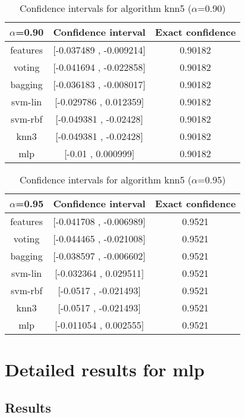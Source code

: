 \documentclass[a4paper,10pt]{article}
\begin{document}
\begin{table}[!htp]
\centering\small
\begin{tabular}{
|c|c|c|}
\hline
 $\alpha$=0.90 & Confidence interval & Exact confidence \\ \hline 
features & [-0.037489 , -0.009214] & 0.90182\\ \hline 
voting & [-0.041694 , -0.022858] & 0.90182\\ \hline 
bagging & [-0.036183 , -0.008017] & 0.90182\\ \hline 
svm-lin & [-0.029786 , 0.012359] & 0.90182\\ \hline 
svm-rbf & [-0.049381 , -0.02428] & 0.90182\\ \hline 
knn3 & [-0.049381 , -0.02428] & 0.90182\\ \hline 
mlp & [-0.01 , 0.000999] & 0.90182\\ \hline 

\end{tabular}
\caption{Confidence intervals for algorithm knn5 ($\alpha$=0.90)}
\end{table}
\begin{table}[!htp]
\centering\small
\begin{tabular}{
|c|c|c|}
\hline
 $\alpha$=0.95 & Confidence interval & Exact confidence \\ \hline 
features & [-0.041708 , -0.006989] & 0.9521\\ \hline 
voting & [-0.044465 , -0.021008] & 0.9521\\ \hline 
bagging & [-0.038597 , -0.006602] & 0.9521\\ \hline 
svm-lin & [-0.032364 , 0.029511] & 0.9521\\ \hline 
svm-rbf & [-0.0517 , -0.021493] & 0.9521\\ \hline 
knn3 & [-0.0517 , -0.021493] & 0.9521\\ \hline 
mlp & [-0.011054 , 0.002555] & 0.9521\\ \hline 

\end{tabular}
\caption{Confidence intervals for algorithm knn5 ($\alpha$=0.95)}
\end{table}

 \clearpage 


\section{Detailed results for mlp}


\subsection{Results}
\end{document}
